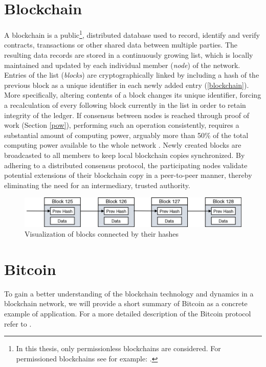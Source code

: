 \documentclass[a4paper,12pt,twoside]{report}
\begin{document}
\section{Blockchain}
A blockchain is a public\footnote{In this thesis, only permissionless blockchains are considered. For permissioned blockchains see for example: \cite{permissioned}.}, distributed database used to record, identify and verify contracts, transactions or other shared data between multiple parties. The resulting data records are stored in a continuously growing list, which is locally maintained and updated by each individual member (\textit{node}) of the network. Entries of the list (\textit{blocks}) are cryptographically linked by including a hash of the previous block as a unique identifier in each newly added entry (\autoref{blockchain}). More specifically, altering contents of a block changes its unique identifier, forcing a recalculation of every following block currently in the list in order to retain integrity of the ledger. If consensus between nodes is reached through proof of work (Section \ref{pow}), performing such an operation consistently, requires a substantial amount of computing power, arguably more than 50\% of the total computing power available to the whole network \cite{nakamoto2008bitcoin}. Newly created blocks are broadcasted to all members to keep local blockchain copies synchronized. By adhering to a distributed consensus protocol, the participating nodes validate potential extensions of their blockchain copy in a peer-to-peer manner, thereby eliminating the need for an intermediary, trusted authority. 

\begin{figure}[ht]
	\centering
  \includegraphics[width=\textwidth]{blockchain.png}
	\caption{Visualization of blocks connected by their hashes}
	\label{blockchain}
\end{figure}
 
\section{Bitcoin} \label{bitcoin}
To gain a better understanding of the blockchain technology and dynamics in a blockchain network, we will provide a short summary of Bitcoin as a concrete example of application. For a more detailed description of the Bitcoin protocol refer to \cite{nakamoto2008bitcoin,antonopoulos2017mastering,okupski2014bitcoin}.
\end{document}
